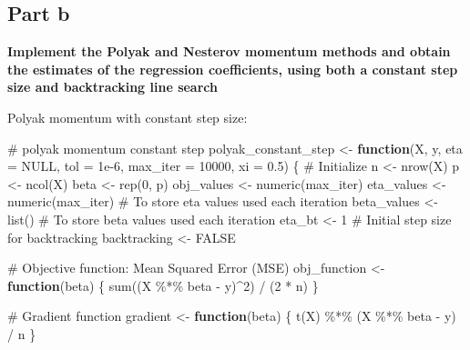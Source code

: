 \documentclass[
  letterpaper,
  DIV=11,
  numbers=noendperiod]{scrartcl}
\newenvironment{Shaded}{\begin{snugshade}}{\end{snugshade}}
\newcommand{\AttributeTok}[1]{\textcolor[rgb]{0.40,0.45,0.13}{#1}}
\newcommand{\CommentTok}[1]{\textcolor[rgb]{0.37,0.37,0.37}{#1}}
\newcommand{\ConstantTok}[1]{\textcolor[rgb]{0.56,0.35,0.01}{#1}}
\newcommand{\ControlFlowTok}[1]{\textcolor[rgb]{0.00,0.23,0.31}{\textbf{#1}}}
\newcommand{\DecValTok}[1]{\textcolor[rgb]{0.68,0.00,0.00}{#1}}
\newcommand{\FloatTok}[1]{\textcolor[rgb]{0.68,0.00,0.00}{#1}}
\newcommand{\FunctionTok}[1]{\textcolor[rgb]{0.28,0.35,0.67}{#1}}
\newcommand{\NormalTok}[1]{\textcolor[rgb]{0.00,0.23,0.31}{#1}}
\newcommand{\OtherTok}[1]{\textcolor[rgb]{0.00,0.23,0.31}{#1}}
\newcommand{\SpecialCharTok}[1]{\textcolor[rgb]{0.37,0.37,0.37}{#1}}
\begin{document}
\subsection{Part b}\label{part-b-1}

\textbf{Implement the Polyak and Nesterov momentum methods and obtain
the estimates of the regression coefficients, using both a constant step
size and backtracking line search}

Polyak momentum with constant step size:

\begin{Shaded}
\begin{Highlighting}[]
\CommentTok{\# polyak momentum constant step}
\NormalTok{polyak\_constant\_step }\OtherTok{\textless{}{-}} \ControlFlowTok{function}\NormalTok{(X, y, }\AttributeTok{eta =} \ConstantTok{NULL}\NormalTok{, }\AttributeTok{tol =} \FloatTok{1e{-}6}\NormalTok{, }\AttributeTok{max\_iter =} \DecValTok{10000}\NormalTok{, }\AttributeTok{xi =} \FloatTok{0.5}\NormalTok{) \{}
  \CommentTok{\# Initialize}
\NormalTok{  n }\OtherTok{\textless{}{-}} \FunctionTok{nrow}\NormalTok{(X)}
\NormalTok{  p }\OtherTok{\textless{}{-}} \FunctionTok{ncol}\NormalTok{(X)}
\NormalTok{  beta }\OtherTok{\textless{}{-}} \FunctionTok{rep}\NormalTok{(}\DecValTok{0}\NormalTok{, p)}
\NormalTok{  obj\_values }\OtherTok{\textless{}{-}} \FunctionTok{numeric}\NormalTok{(max\_iter)}
\NormalTok{  eta\_values }\OtherTok{\textless{}{-}} \FunctionTok{numeric}\NormalTok{(max\_iter)  }\CommentTok{\# To store eta values used each iteration}
\NormalTok{  beta\_values }\OtherTok{\textless{}{-}} \FunctionTok{list}\NormalTok{() }\CommentTok{\# To store beta values used each iteration}
\NormalTok{  eta\_bt }\OtherTok{\textless{}{-}} \DecValTok{1}  \CommentTok{\# Initial step size for backtracking}
\NormalTok{  backtracking }\OtherTok{\textless{}{-}} \ConstantTok{FALSE}
  
  \CommentTok{\# Objective function: Mean Squared Error (MSE)}
\NormalTok{  obj\_function }\OtherTok{\textless{}{-}} \ControlFlowTok{function}\NormalTok{(beta) \{}
    \FunctionTok{sum}\NormalTok{((X }\SpecialCharTok{\%*\%}\NormalTok{ beta }\SpecialCharTok{{-}}\NormalTok{ y)}\SpecialCharTok{\^{}}\DecValTok{2}\NormalTok{) }\SpecialCharTok{/}\NormalTok{ (}\DecValTok{2} \SpecialCharTok{*}\NormalTok{ n)}
\NormalTok{  \}}
  
  \CommentTok{\# Gradient function}
\NormalTok{  gradient }\OtherTok{\textless{}{-}} \ControlFlowTok{function}\NormalTok{(beta) \{}
    \FunctionTok{t}\NormalTok{(X) }\SpecialCharTok{\%*\%}\NormalTok{ (X }\SpecialCharTok{\%*\%}\NormalTok{ beta }\SpecialCharTok{{-}}\NormalTok{ y) }\SpecialCharTok{/}\NormalTok{ n}
\NormalTok{  \}}



\end{Highlighting}
\end{Shaded}
\end{document}
